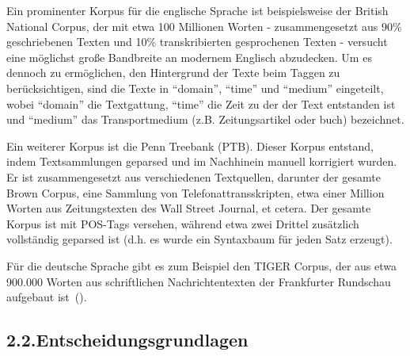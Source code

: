 \documentclass{article}
\begin{document}
Ein prominenter Korpus für die englische Sprache ist beispielsweise der British National Corpus, der mit etwa 100 Millionen Worten - zusammengesetzt aus 90\% geschriebenen Texten und 10\% transkribierten gesprochenen Texten - versucht eine möglichst große Bandbreite an modernem Englisch abzudecken. Um es dennoch zu ermöglichen, den Hintergrund der Texte beim Taggen zu berücksichtigen, sind die Texte in \textquotedblleft{}domain\textquotedblright{}, \textquotedblleft{}time\textquotedblright{} und \textquotedblleft{}medium\textquotedblright{} eingeteilt, wobei \textquotedblleft{}domain\textquotedblright{} die Textgattung, \textquotedblleft{}time\textquotedblright{} die Zeit zu der der Text entstanden ist und \textquotedblleft{}medium\textquotedblright{} das Transportmedium (z.B. Zeitungsartikel oder buch) bezeichnet.%

Ein weiterer Korpus ist die Penn Treebank (PTB). Dieser Korpus entstand, indem Textsammlungen geparsed und im Nachhinein manuell korrigiert wurden. Er ist zusammengesetzt aus verschiedenen Textquellen, darunter der gesamte Brown Corpus, eine Sammlung von Telefonattransskripten, etwa einer Million Worten aus Zeitungstexten des Wall Street Journal, et cetera. Der gesamte Korpus ist mit POS-Tags versehen, während etwa zwei Drittel zusätzlich vollständig geparsed ist (d.h. es wurde ein Syntaxbaum für jeden Satz erzeugt).%

Für die deutsche Sprache gibt es zum Beispiel den TIGER Corpus, der aus etwa 900.000 Worten aus schriftlichen Nachrichtentexten der Frankfurter Rundschau aufgebaut ist~().%

\subsection{2.2.\hspace*{0.5em}Entscheidungsgrundlagen}\label{sec-entscheidungsgrundlagen}%
\end{document}
